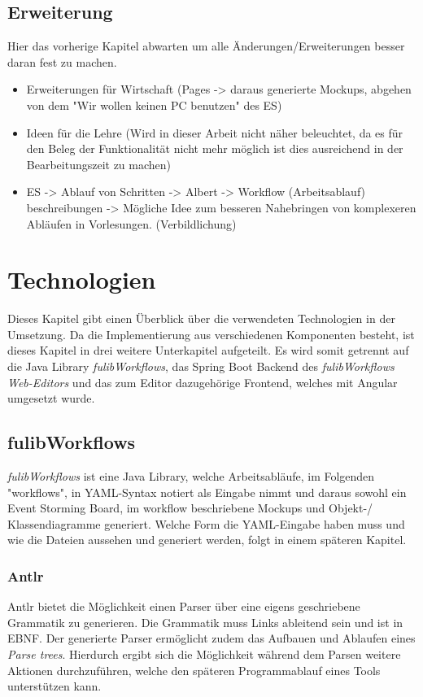 \subsection{Erweiterung}\label{subsec:erweiterung}
\todo Hier das vorherige Kapitel abwarten um alle Änderungen/Erweiterungen besser daran fest zu machen.
\begin{itemize}
    \item Erweiterungen für Wirtschaft (Pages -> daraus generierte Mockups, abgehen von dem "Wir wollen keinen PC benutzen" des ES)
    \item Ideen für die Lehre (Wird in dieser Arbeit nicht näher beleuchtet, da es für den Beleg der Funktionalität nicht mehr möglich ist dies ausreichend in der Bearbeitungszeit zu machen)
    \item ES -> Ablauf von Schritten -> Albert -> Workflow (Arbeitsablauf) beschreibungen -> Mögliche Idee zum besseren Nahebringen von komplexeren Abläufen in Vorlesungen. (Verbildlichung)
\end{itemize}

\section{Technologien}\label{sec:technologien}
Dieses Kapitel gibt einen Überblick über die verwendeten Technologien in der Umsetzung.
Da die Implementierung aus verschiedenen Komponenten besteht, ist dieses Kapitel in drei weitere Unterkapitel aufgeteilt.
Es wird somit getrennt auf die Java Library \textit{fulibWorkflows}, das Spring Boot Backend des \textit{fulibWorkflows Web-Editors}
und das zum Editor dazugehörige Frontend, welches mit Angular umgesetzt wurde.

\subsection{fulibWorkflows}\label{subsec:fulibworkflows}
\textit{fulibWorkflows} ist eine Java Library, welche Arbeitsabläufe, im Folgenden "workflows", in \ac*{YAML}-Syntax notiert als Eingabe nimmt und daraus
sowohl ein Event Storming Board, im workflow beschriebene Mockups und Objekt-/ Klassendiagramme generiert.
Welche Form die YAML-Eingabe haben muss und wie die Dateien aussehen und generiert werden, folgt in einem späteren Kapitel.

\subsubsection{Antlr}\label{subsubsec:antlr}
Antlr bietet die Möglichkeit einen Parser über eine eigens geschriebene Grammatik zu generieren.
Die Grammatik muss Links ableitend sein und ist in EBNF. 
Der generierte Parser ermöglicht zudem das Aufbauen und Ablaufen eines \textit{Parse trees}.
Hierdurch ergibt sich die Möglichkeit während dem Parsen weitere Aktionen durchzuführen, welche den späteren Programmablauf eines Tools unterstützen kann.

